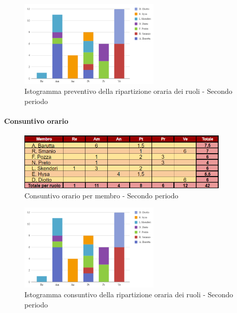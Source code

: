 \vspace{0.6cm}

\begin{figure}[H]
    \centering
    \includegraphics[width=0.6\textwidth]{../Images/preventivoDivisioneRuoli2Periodo.png}
    \caption{Istogramma preventivo della ripartizione oraria dei ruoli - Secondo periodo}
    \label{fig:Preventivo_ripartizione_oraria_2}
\end{figure}

\paragraph{Consuntivo orario } 

\begin{figure}[H]
    \centering
    \includegraphics[width=0.9\textwidth]{../Images/consuntivoOrario2Periodo.png}
    \caption{Consuntivo orario per membro - Secondo periodo}
    \label{fig:Constuntivo_orario_2}
\end{figure}

\vspace{0.6cm}

\begin{figure}[H]
    \centering
    \includegraphics[width=0.6\textwidth]{../Images/consuntivoDivisioneRuoli2Periodo.png}
    \caption{Istogramma consuntivo della ripartizione oraria dei ruoli - Secondo periodo}
    \label{fig:Consuntivo_ripartizione_oraria_2}
\end{figure}



